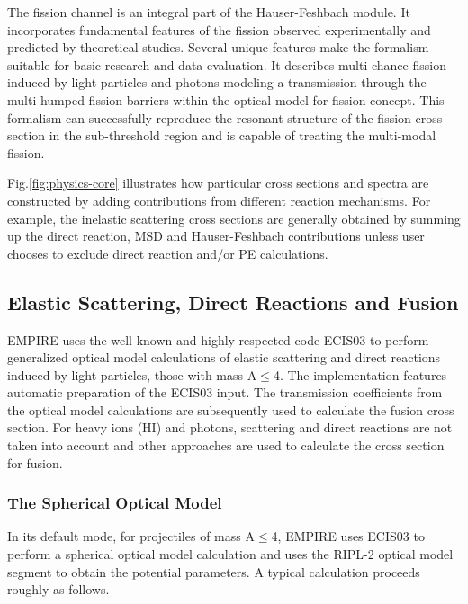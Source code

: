 \documentclass[twocolumn,amsmath,amssymb,10pt,groupedaddress,letter]{revtex4}
\begin{document}
The fission channel is an integral part of the Hauser-Feshbach module. It incorporates
fundamental features of the fission observed experimentally and predicted by theoretical studies. Several unique features make the formalism suitable for basic research and data evaluation.  It describes multi-chance  fission induced by light particles and photons modeling a transmission through the multi-humped fission barriers within the optical model for fission concept. This formalism can successfully reproduce the resonant structure of the fission cross section in the sub-threshold region and is capable of treating the multi-modal fission.

Fig.\ref{fig:physics-core} illustrates how particular cross sections and spectra are constructed by adding contributions from different reaction mechanisms. For example, the inelastic scattering cross sections are generally obtained by summing up the direct reaction, MSD and Hauser-Feshbach contributions unless user chooses to exclude direct reaction and/or PE calculations.


\subsection{Elastic Scattering, Direct Reactions and Fusion}


EMPIRE uses the well known and highly respected code ECIS03 \cite{ECIS}
to perform generalized optical model calculations of elastic scattering and
direct reactions induced by light particles, those with mass A$\leq$4.
 The implementation features automatic preparation of
the ECIS03 input. The transmission coefficients from the optical model
calculations are subsequently used to calculate the fusion cross section. For heavy
ions (HI) and photons, scattering and direct reactions are not taken into
account and other approaches are used to calculate the cross section
for fusion.

\subsubsection{The Spherical Optical Model\label{sec:sph-opt}}

In its default mode, for projectiles of mass A$\leq$4,
 EMPIRE uses ECIS03 to perform a spherical optical
model calculation and uses the RIPL-2 \cite{RIPL2} optical
model segment to obtain the potential parameters. A typical calculation proceeds
roughly as follows.
\end{document}
